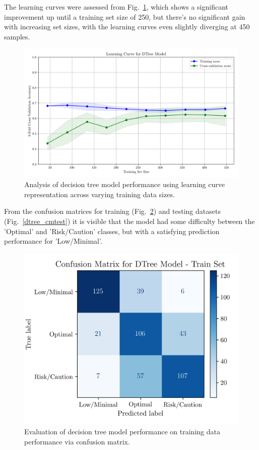 \documentclass[conference]{IEEEtran}
\begin{document}
The learning curves were assessed from Fig.~\ref{dtree_lcurve}, which shows a significant improvement up until a training set size of 250, but there's no significant gain with increasing set sizes, with the learning curves even slightly diverging at 450 samples.

\begin{figure}[H]
    \centering
    \includegraphics[width=1\linewidth]{assets/DTREE_LearningCurve.png}
    \caption{Analysis of decision tree model performance using learning curve representation across varying training data sizes.}
    \label{dtree_lcurve}
\end{figure} %

From the confusion matrices for training (Fig.~\ref{dtree_cmtrain}) and testing datasets (Fig.~\ref{dtree_cmtest}) it is visible that the model had some difficulty between the 'Optimal' and 'Risk/Caution' classes, but with a satisfying prediction performance for 'Low/Minimal'.

\begin{figure}[H]
    \centering
    \includegraphics[width=.995\linewidth]{assets/DTREE_ConfusionMatrixTrain.png}
    \caption{Evaluation of decision tree model performance on training data performance via confusion matrix.}
    \label{dtree_cmtrain}
\end{figure} %
\end{document}
